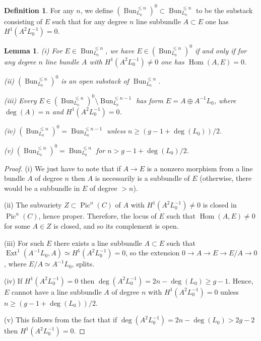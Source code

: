 \documentclass[12pt,reqno]{amsart}
\newtheorem{lemma}[theorem]{Lemma}
\theoremstyle{definition}
\newtheorem{definition}[theorem]{Definition}
\theoremstyle{remark}
\numberwithin{equation}{section}
\newcommand{\Pic}{\operatorname{Pic}}
\newcommand{\Hom}{\operatorname{Hom}}
\newcommand{\Ext}{\operatorname{Ext}}
\newcommand{\sub}{\subset}
\newcommand{\Bun}{{\operatorname{Bun}}}
\begin{document}

\begin{definition}
For any $n$, we define $(\Bun_{L_0}^{\le n})^0\sub \Bun_{L_0}^{\le n}$ to be the substack consisting of $E$ such that for any degree $n$ line subbundle $A\sub E$ one has 
$H^1(A^2L_0^{-1})=0$. 
\end{definition}

\begin{lemma}\label{complement-bundle-lem}
(i) For $E\in \Bun_{L_0}^{\le n}$, we have $E\in (\Bun_{L_0}^{\le n})^0$ if and only if 
for any degree $n$ line bundle $A$ with $H^1(A^2L_0^{-1})\neq 0$ one has $\Hom(A,E)=0$. 

\noindent
(ii) $(\Bun_{L_0}^{\le n})^0$ is an open substack of $\Bun_{L_0}^{\le n}$.

\noindent
(iii) Every $E\in (\Bun_{L_0}^{\le n})^0\setminus\Bun_{L_0}^{\le n-1}$ has form $E=A\oplus A^{-1}L_0$, where $\deg(A)=n$ and
$H^1(A^2L_0^{-1})=0$.

\noindent
(iv) $(\Bun_{L_0}^{\le n})^0=\Bun_{L_0}^{\le n-1}$ unless $n\ge (g-1+\deg(L_0))/2$.

\noindent
(v) $(\Bun_{L_0}^{\le n})^0=\Bun_{L_0}^{\le n}$ for $n>g-1+\deg(L_0)/2$.
\end{lemma}

\begin{proof}
(i) We just have to note that if $A\to E$ is a nonzero morphism from a line bundle $A$ of degree $n$ then $A$ is necessarily is a subbundle of $E$ (otherwise, there would be a subbundle in $E$ of degree $>n$).

\noindent
(ii) The subvariety $Z\sub \Pic^n(C)$ of $A$ with $H^1(A^2L_0^{-1})\neq 0$ is closed in $\Pic^n(C)$, hence proper. Therefore, the locus of $E$ such that $\Hom(A,E)\neq 0$
for some $A\in Z$ is closed, and so its complement is open.

\noindent
(iii) For such $E$ there exists a line subbundle $A\sub E$ such that $\Ext^1(A^{-1}L_0,A)\simeq H^1(A^2L_0^{-1})=0$, so the extension $0\to A\to E\to E/A\to 0$, where
$E/A\simeq A^{-1}L_0$, splits.

\noindent
(iv) If $H^1(A^2L_0^{-1})=0$ then $\deg(A^2L_0^{-1})=2n-\deg(L_0)\ge g-1$. Hence, $E$ cannot have a line subbundle $A$ of degree $n$ with $H^1(A^2L_0^{-1})=0$
unless  $n\ge (g-1+\deg(L_0))/2$.

\noindent
(v) This follows from the fact that if $\deg(A^2L_0^{-1})=2n-\deg(L_0)>2g-2$ then $H^1(A^2L_0^{-1})=0$.
\end{proof}
\end{document}
